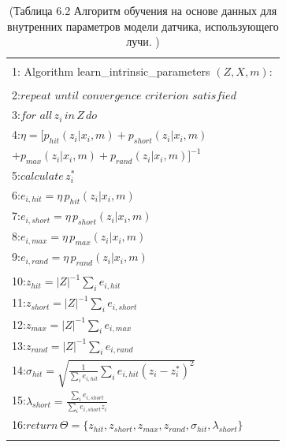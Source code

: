 \documentclass[10pt,a4paper]{article}
\begin{document}
\begin{table}[H]
\begin{center}
\begin{tabular}{|l|}
\hline
{}\\
1: \hspace{3mm} Algorithm learn\_intrinsic\_parameters $(Z,X,m):$ \\
{}\\
2:\hspace{7mm}$\textit{repeat until convergence criterion satisfied}$\\
3:\hspace{12mm}$\textit{for all} \,z_i\,\textit{in}\,Z\,\textit{do}$\\
4:\hspace{17mm}$\eta={[ } p_{hit}(z_i|x_i,m)+p_{short}(z_i|x_i,m)$\\
\hspace{23mm}$ +p_{max}(z_i|x_i,m)+p_{rand}(z_i|x_i,m){] } ^{-1}$\\
5:\hspace{17mm}$\textit{calculate}\,z_i^*$\\
6:\hspace{17mm}$e_{i,hit}=\eta\,p_{hit}(z_i|x_i,m)$\\
7:\hspace{17mm}$e_{i,short}=\eta\,p_{short}(z_i|x_i,m)$\\
8:\hspace{17mm}$e_{i,max}=\eta\,p_{max}(z_i|x_i,m)$\\
9:\hspace{17mm}$e_{i,rand}=\eta\,p_{rand}(z_i|x_i,m)$\\
{}\\
10:\hspace{12mm}$z_{hit}=|Z|^{-1}\sum_i e_{i,hit}$\\
11:\hspace{12mm}$z_{short}=|Z|^{-1}\sum_i e_{i,short}$\\
12:\hspace{12mm}$z_{max}=|Z|^{-1}\sum_i e_{i,max}$\\
13:\hspace{12mm}$z_{rand}=|Z|^{-1}\sum_i e_{i,rand}$\\
14:\hspace{12mm}$\sigma_{hit}=\sqrt{\frac{1}{\sum_i e_{i,hit}}\sum_i e_{i,hit}(z_i-z_i^*)^2}$\\
15:\hspace{12mm}$\lambda_{short}=\frac{\sum_i e_{i,short}}{\sum_i e_{i,short}z_i}$\\
16:\hspace{7mm}$\textit{return}\,\varTheta=\{ z_{hit},z_{short},z_{max},z_{rand},\sigma_{hit},\lambda_{short}\}$\\
{}\\
\hline
\end{tabular}
\caption{(Таблица 6.2 Алгоритм обучения на основе данных для внутренних параметров модели датчика, использующего лучи. )}
\end{center}
\end{table}
\end{document}
